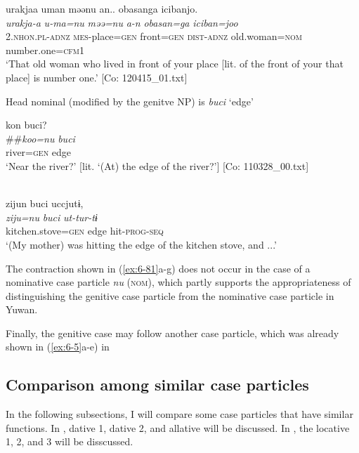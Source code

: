 \ex {\TM}  urakjaa  uman  məənu  an..   {\textbar}obasan{\textbar}ga  {\textbar}iciban{\textbar}jo.\\
\glll \textit{urakja-a}  \textit{u-ma=nu}  \textit{məə=nu}  \textit{a-n}   \textit{obasan=ga}  \textit{iciban=joo}\\
2.\textsc{nhon}.\textsc{pl}-\textsc{adnz}  \textsc{mes}-place=\textsc{gen}  front=\textsc{gen}  \textsc{dist}-\textsc{adnz}  old.woman=\textsc{nom}  number.one=\textsc{cfm}1\\
\glt ‘That old woman who lived in front of your place [lit. of the front of your that place] is number one.’ [Co: 120415\_01.txt]
\z

  Head nominal (modified by the genitve NP) is \textit{buci} ‘edge’

\ex
{\TM}
\gll kon  buci?\\##\textit{koo=nu}  \textit{buci}\\
      river=\textsc{gen}  edge\\
\glt ‘Near the river?’ [lit. ‘(At) the edge of the river?’]      [Co: 110328\_00.txt]
\z

\\
{\TM}
\glll zijun  buci  uccjutɨ,\\
      \textit{ziju=nu}  \textit{buci}  \textit{ut-tur-tɨ}\\
      kitchen.stove=\textsc{gen}  edge  hit-\textsc{prog}-\textsc{seq}\\
\glt ‘(My mother) was hitting the edge of the kitchen stove, and ...’

The contraction shown in (\ref{ex:6-81}a-g) does not occur in the case of a nominative case particle \textit{nu} (\textsc{nom}), which partly supports the appropriateness of distinguishing the genitive case particle from the nominative case particle in Yuwan.

  Finally, the genitive case may follow another case particle, which was already shown in (\ref{ex:6-5}a-e) in 

\subsection{Comparison among similar case particles}

In the following subsections, I will compare some case particles that have similar functions. In , dative 1, dative 2, and allative will be discussed. In , the locative 1, 2, and 3 will be disscussed.

